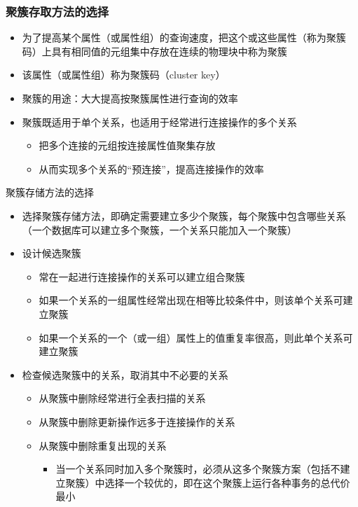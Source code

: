 \subsubsection{聚簇存取方法的选择}
\begin{itemize}
    \item 为了提高某个属性（或属性组）的查询速度，把这个或这些属性（称为聚簇码）上具有相同值的元组集中存放在连续的物理块中称为聚簇
    \item 该属性（或属性组）称为聚簇码（cluster key）
    \item 聚簇的用途：大大提高按聚簇属性进行查询的效率  
    \item 聚簇既适用于单个关系，也适用于经常进行连接操作的多个关系
    \begin{itemize}
        \item 把多个连接的元组按连接属性值聚集存放
        \item 从而实现多个关系的“预连接”，提高连接操作的效率
    \end{itemize} 
\end{itemize}

聚簇存储方法的选择
\begin{itemize}
    \item 选择聚簇存储方法，即确定需要建立多少个聚簇，每个聚簇中包含哪些关系（一个数据库可以建立多个聚簇，一个关系只能加入一个聚簇）
    \item 设计候选聚簇
    \begin{itemize}
        \item 常在一起进行连接操作的关系可以建立组合聚簇
        \item 如果一个关系的一组属性经常出现在相等比较条件中，则该单个关系可建立聚簇
        \item 如果一个关系的一个（或一组）属性上的值重复率很高，则此单个关系可建立聚簇
    \end{itemize}
    \item 检查候选聚簇中的关系，取消其中不必要的关系
    \begin{itemize}
        \item 从聚簇中删除经常进行全表扫描的关系
        \item 从聚簇中删除更新操作远多于连接操作的关系
        \item 从聚簇中删除重复出现的关系
        \begin{itemize}
            \item 当一个关系同时加入多个聚簇时，必须从这多个聚簇方案（包括不建立聚簇）中选择一个较优的，即在这个聚簇上运行各种事务的总代价最小
        \end{itemize}
    \end{itemize}
\end{itemize}


